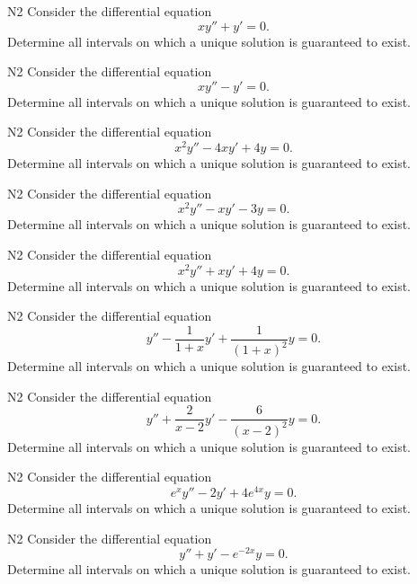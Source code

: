 

\begin{problem}{N2}
Consider the differential equation
\[
xy'' + y' = 0.
\]
Determine all intervals on which a unique solution is guaranteed to exist.
\end{problem}

\begin{problem}{N2}
Consider the differential equation
\[
xy'' - y' = 0.
\]
Determine all intervals on which a unique solution is guaranteed to exist.
\end{problem}

\begin{problem}{N2}
Consider the differential equation
\[
x^2y'' - 4xy' + 4y = 0.
\]
Determine all intervals on which a unique solution is guaranteed to exist.
\end{problem}

\begin{problem}{N2}
Consider the differential equation
\[
x^2y'' - xy' - 3y = 0.
\]
Determine all intervals on which a unique solution is guaranteed to exist.
\end{problem}

\begin{problem}{N2}
Consider the differential equation
\[
x^2y'' + xy' + 4y = 0.
\]
Determine all intervals on which a unique solution is guaranteed to exist.
\end{problem}

\begin{problem}{N2}
Consider the differential equation
\[
y'' - \frac{1}{1+x}y' + \frac{1}{(1+x)^2}y = 0.
\]
Determine all intervals on which a unique solution is guaranteed to exist.
\end{problem}

\begin{problem}{N2}
Consider the differential equation
\[
y'' + \frac{2}{x-2}y' - \frac{6}{(x-2)^2}y = 0.
\]
Determine all intervals on which a unique solution is guaranteed to exist.
\end{problem}

\begin{problem}{N2}
Consider the differential equation
\[
e^xy'' -2y' + 4e^{4x}y = 0.
\]
Determine all intervals on which a unique solution is guaranteed to exist.
\end{problem}

\begin{problem}{N2}
Consider the differential equation
\[
y'' + y' - e^{-2x}y = 0.
\]
Determine all intervals on which a unique solution is guaranteed to exist.
\end{problem}

